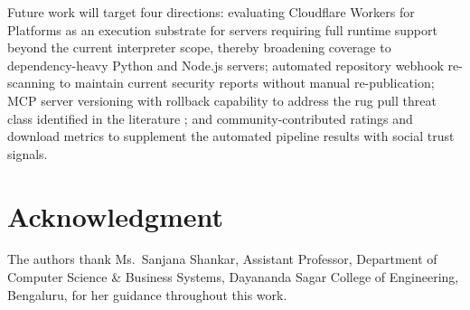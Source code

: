 \documentclass[conference]{IEEEtran}
\begin{document}
Future work will target four directions: evaluating Cloudflare Workers
for Platforms as an execution substrate for servers requiring full
runtime support beyond the current interpreter scope, thereby broadening
coverage to dependency-heavy Python and Node.js servers; automated
repository webhook re-scanning to maintain current security reports
without manual re-publication; MCP server versioning with rollback
capability to address the rug pull threat class identified in the
literature \cite{jamshidi2025}; and community-contributed ratings and
download metrics to supplement the automated pipeline results with
social trust signals.

\section*{Acknowledgment}

The authors thank Ms.~Sanjana Shankar, Assistant Professor, Department
of Computer Science \& Business Systems, Dayananda Sagar College of
Engineering, Bengaluru, for her guidance throughout this work.
\end{document}
